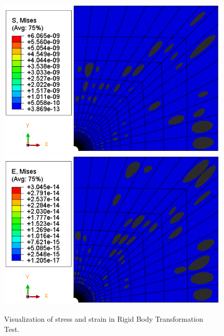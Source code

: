 \documentclass[12pt]{article}
\begin{document}
\begin{figure}[H]
	\begin{center}
		\includegraphics[scale=0.49]{Rigid_body_stress_crop.png} 
		\includegraphics[scale=0.49]{Rigid_body_strain_crop.png} 
	\end{center}
	\caption{Visualization of stress and strain in Rigid Body Transformation Test.} 
\end{figure}
\newpage
\end{document}
